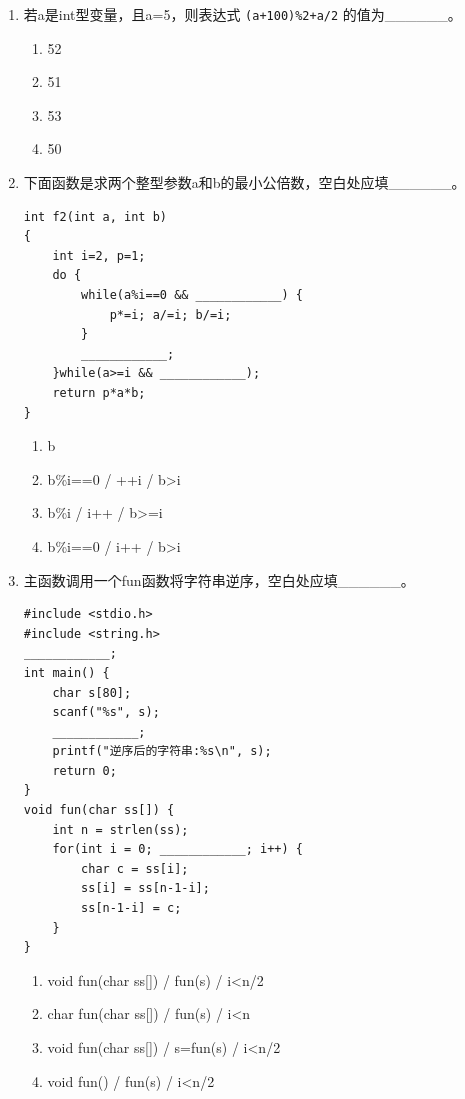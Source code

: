 \documentclass[a4paper,12pt]{article}
\begin{document}
\begin{enumerate}
	\item 若a是int型变量，且a=5，则表达式 \texttt{(a+100)\%2+a/2} 的值为\_\_\_\_\_\_。
	      \begin{enumerate}
		      \item[A)] 52
		      \item[B)] 51
		      \item[C)] 53
		      \item[D] 50
	      \end{enumerate}
	      \vspace{0.3cm}

	\item 下面函数是求两个整型参数a和b的最小公倍数，空白处应填\_\_\_\_\_\_。
	      \begin{verbatim}
int f2(int a, int b)
{
    int i=2, p=1;
    do {
        while(a%i==0 && ____________) {
            p*=i; a/=i; b/=i;
        }
        ____________;
    }while(a>=i && ____________);
    return p*a*b;
}
    \end{verbatim}
	      \begin{enumerate}
		      \item[A)] b%
		      \item[B)] b\%i==0 / ++i / b>i
		      \item[C)] b\%i / i++ / b>=i
		      \item[D] b\%i==0 / i++ / b>i
	      \end{enumerate}
	      \vspace{0.3cm}

	\item 主函数调用一个fun函数将字符串逆序，空白处应填\_\_\_\_\_\_。
	      \begin{verbatim}
#include <stdio.h>
#include <string.h>
____________;
int main() {
    char s[80];
    scanf("%s", s);
    ____________;
    printf("逆序后的字符串:%s\n", s);
    return 0;
}
void fun(char ss[]) {
    int n = strlen(ss);
    for(int i = 0; ____________; i++) {
        char c = ss[i];
        ss[i] = ss[n-1-i];
        ss[n-1-i] = c;
    }
}
    \end{verbatim}
	      \begin{enumerate}
		      \item[A)] void fun(char ss[]) / fun(s) / i<n/2
		      \item[B)] char fun(char ss[]) / fun(s) / i<n
		      \item[C)] void fun(char ss[]) / s=fun(s) / i<n/2
		      \item[D] void fun() / fun(s) / i<n/2
	      \end{enumerate}
	      \vspace{0.3cm}


\end{enumerate}
\end{document}

